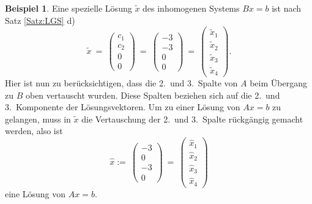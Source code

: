 \documentclass[a4paper,11pt,oneside]{article}
\theoremstyle{definition}
\newtheorem{example}{Beispiel}
\begin{document}
\begin{example}
Eine spezielle Lösung ${\tilde x}$ des inhomogenen Systems $Bx=b$ ist nach Satz \ref{Satz:LGS} d)
$$
{\tilde x}\ =\
\begin{pmatrix}c_1\\c_2\\0\\0\end{pmatrix}
\ =\
\begin{pmatrix}-3\\ -3\\ 0\\0\end{pmatrix}
\ =\
\begin{pmatrix}\tilde{x}_1\\\tilde{x}_2\\\tilde{x}_3\\\tilde{x}_4\end{pmatrix}.
$$
Hier ist nun  zu berücksichtigen, dass die 2.\ und 3.\ Spalte von $A$ beim Übergang zu $B$ oben vertauscht wurden. Diese Spalten beziehen sich auf die 2.\ und 3.\ Komponente der Lösungsvektoren. Um zu einer Lösung von $Ax=b$ zu gelangen, muss in ${\tilde x}$ die Vertauschung der 2.\ und 3.\ Spalte rückgängig gemacht werden, also ist
$$
{\hat x} :=\
\begin{pmatrix}-3\\0\\-3\\0\end{pmatrix}
\ =\
\begin{pmatrix}\hat{x}_1\\\hat{x}_2\\\hat{x}_3\\\hat{x}_4\end{pmatrix}
$$
eine Lösung von $Ax=b$.


\end{example}
\end{document}
